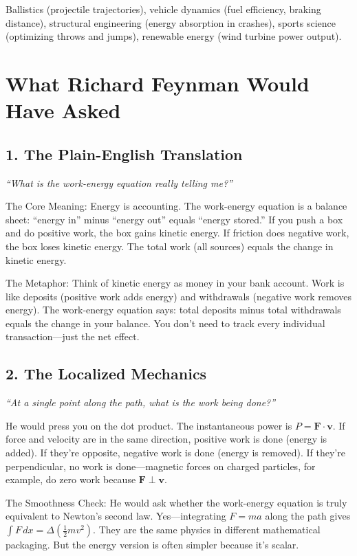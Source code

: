 Ballistics (projectile trajectories), vehicle dynamics (fuel efficiency, braking distance), structural engineering (energy absorption in crashes), sports science (optimizing throws and jumps), renewable energy (wind turbine power output).
\section*{What Richard Feynman Would Have Asked}

\subsection*{1. The Plain-English Translation}
\textit{``What is the work-energy equation really telling me?''}

The Core Meaning: Energy is accounting. The work-energy equation is a balance sheet: ``energy in'' minus ``energy out'' equals ``energy stored.'' If you push a box and do positive work, the box gains kinetic energy. If friction does negative work, the box loses kinetic energy. The total work (all sources) equals the change in kinetic energy.

The Metaphor: Think of kinetic energy as money in your bank account. Work is like deposits (positive work adds energy) and withdrawals (negative work removes energy). The work-energy equation says: total deposits minus total withdrawals equals the change in your balance. You don't need to track every individual transaction---just the net effect.

\subsection*{2. The Localized Mechanics}
\textit{``At a single point along the path, what is the work being done?''}

He would press you on the dot product. The instantaneous power is $P = \mathbf{F} \cdot \mathbf{v}$. If force and velocity are in the same direction, positive work is done (energy is added). If they're opposite, negative work is done (energy is removed). If they're perpendicular, no work is done---magnetic forces on charged particles, for example, do zero work because $\mathbf{F} \perp \mathbf{v}$.

The Smoothness Check: He would ask whether the work-energy equation is truly equivalent to Newton's second law. Yes---integrating $F = ma$ along the path gives $\int F \, dx = \Delta(\frac{1}{2}mv^2)$. They are the same physics in different mathematical packaging. But the energy version is often simpler because it's scalar.

